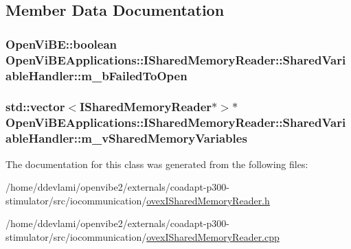 \subsection{Member Data Documentation}
\hypertarget{classOpenViBEApplications_1_1ISharedMemoryReader_1_1SharedVariableHandler_a786e8776654876e573480d8a01ca9def}{
\subsubsection[{m\_\-bFailedToOpen}]{\setlength{\rightskip}{0pt plus 5cm}OpenViBE::boolean {\bf OpenViBEApplications::ISharedMemoryReader::SharedVariableHandler::m\_\-bFailedToOpen}}}
\label{classOpenViBEApplications_1_1ISharedMemoryReader_1_1SharedVariableHandler_a786e8776654876e573480d8a01ca9def}
\hypertarget{classOpenViBEApplications_1_1ISharedMemoryReader_1_1SharedVariableHandler_a917fa226452689369512d88779ecca5d}{
\subsubsection[{m\_\-vSharedMemoryVariables}]{\setlength{\rightskip}{0pt plus 5cm}std::vector$<${\bf ISharedMemoryReader}$\ast$$>$$\ast$ {\bf OpenViBEApplications::ISharedMemoryReader::SharedVariableHandler::m\_\-vSharedMemoryVariables}}}
\label{classOpenViBEApplications_1_1ISharedMemoryReader_1_1SharedVariableHandler_a917fa226452689369512d88779ecca5d}


The documentation for this class was generated from the following files:\begin{DoxyCompactItemize}
\item 
/home/ddevlami/openvibe2/externals/coadapt-\/p300-\/stimulator/src/iocommunication/\hyperlink{ovexISharedMemoryReader_8h}{ovexISharedMemoryReader.h}\item 
/home/ddevlami/openvibe2/externals/coadapt-\/p300-\/stimulator/src/iocommunication/\hyperlink{ovexISharedMemoryReader_8cpp}{ovexISharedMemoryReader.cpp}\end{DoxyCompactItemize}
